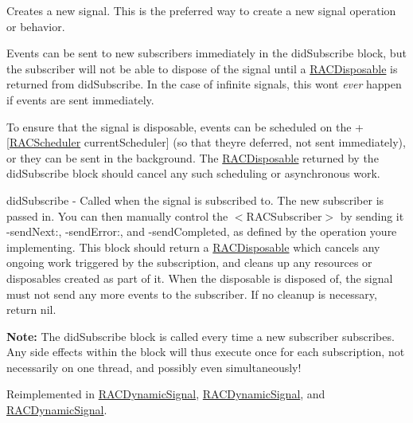 Creates a new signal. This is the preferred way to create a new signal operation or behavior.

Events can be sent to new subscribers immediately in the {\ttfamily did\+Subscribe} block, but the subscriber will not be able to dispose of the signal until a \mbox{\hyperlink{interface_r_a_c_disposable}{R\+A\+C\+Disposable}} is returned from {\ttfamily did\+Subscribe}. In the case of infinite signals, this won\textquotesingle{}t {\itshape ever} happen if events are sent immediately.

To ensure that the signal is disposable, events can be scheduled on the +\mbox{[}\mbox{\hyperlink{interface_r_a_c_scheduler}{R\+A\+C\+Scheduler}} current\+Scheduler\mbox{]} (so that they\textquotesingle{}re deferred, not sent immediately), or they can be sent in the background. The \mbox{\hyperlink{interface_r_a_c_disposable}{R\+A\+C\+Disposable}} returned by the {\ttfamily did\+Subscribe} block should cancel any such scheduling or asynchronous work.

did\+Subscribe -\/ Called when the signal is subscribed to. The new subscriber is passed in. You can then manually control the $<$\+R\+A\+C\+Subscriber$>$ by sending it -\/send\+Next\+:, -\/send\+Error\+:, and -\/send\+Completed, as defined by the operation you\textquotesingle{}re implementing. This block should return a \mbox{\hyperlink{interface_r_a_c_disposable}{R\+A\+C\+Disposable}} which cancels any ongoing work triggered by the subscription, and cleans up any resources or disposables created as part of it. When the disposable is disposed of, the signal must not send any more events to the {\ttfamily subscriber}. If no cleanup is necessary, return nil.

{\bfseries Note\+:} The {\ttfamily did\+Subscribe} block is called every time a new subscriber subscribes. Any side effects within the block will thus execute once for each subscription, not necessarily on one thread, and possibly even simultaneously! 

Reimplemented in \mbox{\hyperlink{interface_r_a_c_dynamic_signal_aeffa754150754dd6296d5225b5c9c7fe}{R\+A\+C\+Dynamic\+Signal}}, \mbox{\hyperlink{interface_r_a_c_dynamic_signal_aeffa754150754dd6296d5225b5c9c7fe}{R\+A\+C\+Dynamic\+Signal}}, and \mbox{\hyperlink{interface_r_a_c_dynamic_signal_aeffa754150754dd6296d5225b5c9c7fe}{R\+A\+C\+Dynamic\+Signal}}.


